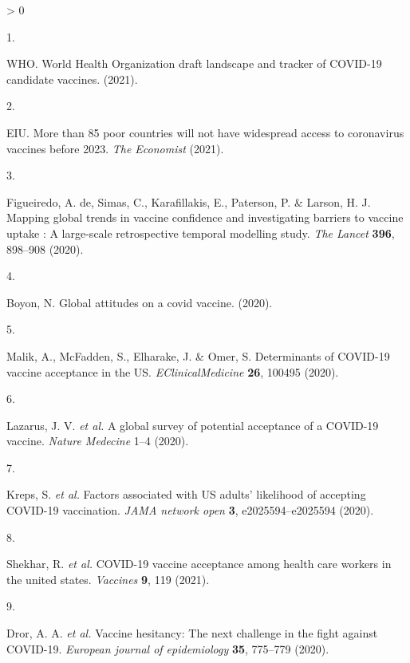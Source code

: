 \documentclass[
  12pt,
]{article}
\newlength{\cslhangindent}
\newlength{\csllabelwidth}
\newenvironment{CSLReferences}[2] %
 {%
  \setlength{\parindent}{0pt}
  \ifodd #1 \everypar{\setlength{\hangindent}{\cslhangindent}}\ignorespaces\fi
  \ifnum #2 > 0
  \setlength{\parskip}{#2\baselineskip}
  \fi
 }%
 {}
\newcommand{\CSLLeftMargin}[1]{\parbox[t]{\csllabelwidth}{#1}}
\newcommand{\CSLRightInline}[1]{\parbox[t]{\linewidth - \csllabelwidth}{#1}\break}
\providecommand{\DIFaddbegin}{} %
\providecommand{\DIFaddend}{} %
\providecommand{\DIFdelbegin}{} %
\providecommand{\DIFdelend}{} %
\newcommand{\DIFscaledelfig}{0.5}
\newlength{\DIFdelgraphicswidth} %
\newlength{\DIFdelgraphicsheight} %
\newcommand{\DIFaddincludegraphics}[2][]{{\color{blue}\fbox{\DIFOincludegraphics[#1]{#2}}}} %
\newcommand{\DIFdelincludegraphics}[2][]{%
\sbox{\DIFdelgraphicsbox}{\DIFOincludegraphics[#1]{#2}}%
\settoboxwidth{\DIFdelgraphicswidth}{\DIFdelgraphicsbox} %
\settoboxtotalheight{\DIFdelgraphicsheight}{\DIFdelgraphicsbox} %
\scalebox{\DIFscaledelfig}{%
\parbox[b]{\DIFdelgraphicswidth}{\usebox{\DIFdelgraphicsbox}\\[-\baselineskip] \rule{\DIFdelgraphicswidth}{0em}}\llap{\resizebox{\DIFdelgraphicswidth}{\DIFdelgraphicsheight}{%
\setlength{\unitlength}{\DIFdelgraphicswidth}%
\begin{picture}(1,1)%
\thicklines\linethickness{2pt} %
{\color[rgb]{1,0,0}\put(0,0){\framebox(1,1){}}}%
{\color[rgb]{1,0,0}\put(0,0){\line( 1,1){1}}}%
{\color[rgb]{1,0,0}\put(0,1){\line(1,-1){1}}}%
\end{picture}%
}\hspace*{3pt}}} %
} %
\DeclareRobustCommand{\DIFaddbegin}{\DIFOaddbegin \let\includegraphics\DIFaddincludegraphics} %
\DeclareRobustCommand{\DIFaddend}{\DIFOaddend \let\includegraphics\DIFOincludegraphics} %
\DeclareRobustCommand{\DIFdelbegin}{\DIFOdelbegin \let\includegraphics\DIFdelincludegraphics} %
\DeclareRobustCommand{\DIFdelend}{\DIFOaddend \let\includegraphics\DIFOincludegraphics} %
\begin{document}
\hypertarget{refs}{}
\begin{CSLReferences}{0}{0}
\leavevmode\hypertarget{ref-who1}{}%
\CSLLeftMargin{1. }
\CSLRightInline{WHO. {World Health Organization} draft landscape and tracker of COVID-19 candidate vaccines. (2021).}

\leavevmode\hypertarget{ref-eiu}{}%
\CSLLeftMargin{2. }
\CSLRightInline{EIU. More than 85 poor countries will not have widespread access to coronavirus vaccines before 2023. \emph{The Economist} (2021).}

\leavevmode\hypertarget{ref-defigueiredo2020lancet}{}%
\CSLLeftMargin{3. }
\CSLRightInline{Figueiredo, A. de, Simas, C., Karafillakis, E., Paterson, P. \& Larson, H. J. Mapping global trends in vaccine confidence and investigating barriers to vaccine uptake : A large-scale retrospective temporal modelling study. \emph{The Lancet} \textbf{396}, 898--908 (2020).}

\leavevmode\hypertarget{ref-boyon2020ipsos}{}%
\CSLLeftMargin{4. }
\CSLRightInline{Boyon, N. Global attitudes on a covid vaccine. (2020).}

\leavevmode\hypertarget{ref-Malik2020}{}%
\CSLLeftMargin{5. }
\CSLRightInline{Malik, A., McFadden, S., Elharake, J. \& Omer, S. Determinants of COVID-19 vaccine acceptance in the US. \emph{EClinicalMedicine} \textbf{26}, 100495 (2020).}

\leavevmode\DIFdelbegin %
\DIFdelend \DIFaddbegin \hypertarget{ref-lazarus2020nature}{}\DIFaddend %
\CSLLeftMargin{6. }
\DIFaddbegin \CSLRightInline{Lazarus, J. V. \emph{et al.} A global survey of potential acceptance of a COVID-19 vaccine. \emph{Nature Medecine} 1--4 (2020).}

\leavevmode\hypertarget{ref-kreps2020factors}{}%
\CSLLeftMargin{7. }
\CSLRightInline{Kreps, S. \emph{et al.} Factors associated with US adults' likelihood of accepting COVID-19 vaccination. \emph{JAMA network open} \textbf{3}, e2025594--e2025594 (2020).}

\leavevmode\hypertarget{ref-shekhar2021covid}{}%
\CSLLeftMargin{8. }
\CSLRightInline{Shekhar, R. \emph{et al.} COVID-19 vaccine acceptance among health care workers in the united states. \emph{Vaccines} \textbf{9}, 119 (2021).}

\leavevmode\hypertarget{ref-dror2020vaccine}{}%
\CSLLeftMargin{9. }
\CSLRightInline{Dror, A. A. \emph{et al.} Vaccine hesitancy: The next challenge in the fight against COVID-19. \emph{European journal of epidemiology} \textbf{35}, 775--779 (2020).}


\end{CSLReferences}
\end{document}
